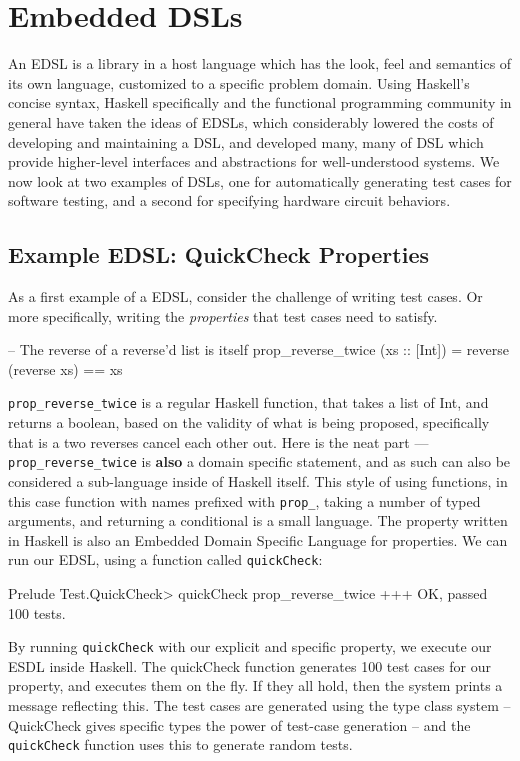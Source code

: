 \documentclass[11pt]{article}
\begin{document}
\section{Embedded DSLs}

An EDSL is a library in a host language which has the look, feel and semantics of its own language,
customized to a specific problem domain.
Using Haskell's concise syntax, Haskell specifically and the functional programming
community in general have taken the ideas
of EDSLs, which considerably lowered the costs of developing
and maintaining a DSL, and developed many, many of DSL 
which provide higher-level interfaces and abstractions for well-understood systems.
We now look at two examples of DSLs, one for automatically generating test cases for software testing,
and a second for specifying hardware circuit behaviors.

\subsection{Example EDSL: QuickCheck Properties}

As a first example of a EDSL, consider the challenge of writing test cases.
Or more specifically, writing the {\em properties\/} that test cases need to satisfy.

\begin{Code}
-- The reverse of a reverse'd list is itself
prop_reverse_twice (xs :: [Int]) = reverse (reverse xs) == xs
\end{Code}

\verb|prop_reverse_twice| is a regular Haskell function,
that takes a list of Int, and returns a boolean, based
on the validity of what is being proposed, specifically
that is a two reverses cancel each other out. 
Here is the neat part --- \verb|prop_reverse_twice| is {\bf also\/} a
domain specific statement, and as such can also be considered
a sub-language inside of Haskell itself.  This style
of using functions, in this case function with names
prefixed with \verb|prop_|, taking a number of typed
arguments, and returning a conditional is a small language.
The property written in Haskell is also an Embedded Domain Specific
Language for properties.
We can run our EDSL, using a function called \verb|quickCheck|:
\begin{Code}
Prelude Test.QuickCheck> quickCheck prop_reverse_twice
+++ OK, passed 100 tests.
\end{Code}
By running \verb|quickCheck| with our explicit and specific property,
we execute our ESDL inside Haskell. The quickCheck function
generates 100 test cases for our property, and executes
them on the fly. If they all hold, then the system prints
a message reflecting this. The test cases are generated using
the type class system -- QuickCheck gives specific types the
power of test-case generation -- and the \verb|quickCheck| function
uses this to generate random tests.
\end{document}
